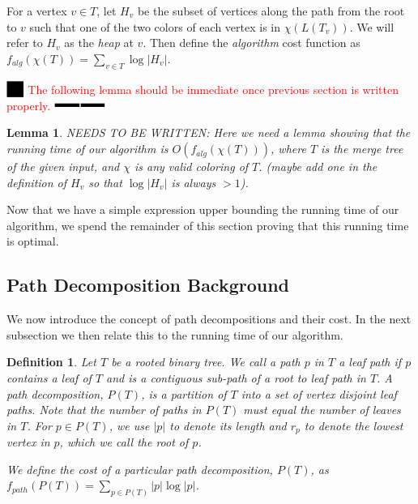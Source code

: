\documentclass[11pt]{article}
\newtheorem{lemma}[theorem]{Lemma}
\newtheorem{definition}[theorem]{Definition}
\theoremstyle{definition}
\newtheorem{observation}{Observation}
\newcommand{\XSays}[2]{{
      {$\rule[-0.12cm]{0.2in}{0.5cm}$\fbox{\tt
            #1:} }
      \textcolor{red}{#2}
      \marginpar{\textcolor{blue}{#1}}
      {$\rule[0.1cm]{0.3in}{0.1cm}$\fbox{\tt
            end}$\rule[0.1cm]{0.3in}{0.1cm}$}
      }
   }
\newcommand{\Ben}[1]{{\XSays{Ben}{#1}}}
\begin{document}
For a vertex $v\in T$, let $H_v$ be the subset of 
vertices along the path from the root to $v$ such that one of the two colors of each vertex is in $\chi(L(T_v))$.
We will refer to $H_v$ as the \emph{heap} at $v$.
Then define the \emph{algorithm} cost function as $f_{alg}(\chi(T)) = \sum_{v\in T} \log |H_v|$.

\Ben{The following lemma should be immediate once previous section is written properly.}
\begin{lemma}
\label{lem:algCost}
NEEDS TO BE WRITTEN:
Here we need a lemma showing that the running time of our algorithm is $O(f_{alg}(\chi(T)))$, where $T$ is the merge tree of the given input, 
and $\chi$ is any valid coloring of $T$.  (maybe add one in the definition of $H_v$ so that $\log |H_v|$ is always $>1$).
\end{lemma}

Now that we have a simple expression upper bounding the running time of our algorithm, we spend the remainder 
of this section proving that this running time is optimal.


\subsection{Path Decomposition Background}
\label{sec:background}
We now introduce the concept of path decompositions and their cost.  In the next subsection we then relate this to the
running time of our algorithm.

\begin{definition}
 Let $T$ be a rooted binary tree.  We call a path $p$ in $T$ a \emph{leaf path} if $p$ contains a leaf of $T$ and 
 is a contiguous sub-path of a root to leaf path in $T$.  A \emph{path decomposition}, $P(T)$, is a partition of $T$ into 
 a set of vertex disjoint leaf paths.  Note that the number of paths in $P(T)$ must equal the number of leaves in $T$.
 For $p\in P(T)$, we use $|p|$ to denote its length and $r_p$ to denote the lowest vertex in $p$, which we call the \emph{root} of $p$.
 
 We define the cost of a particular path decomposition, $P(T)$, as $f_{path}(P(T)) = \sum_{p\in P(T)} |p| \log |p|$.
\end{definition}

\end{document}
